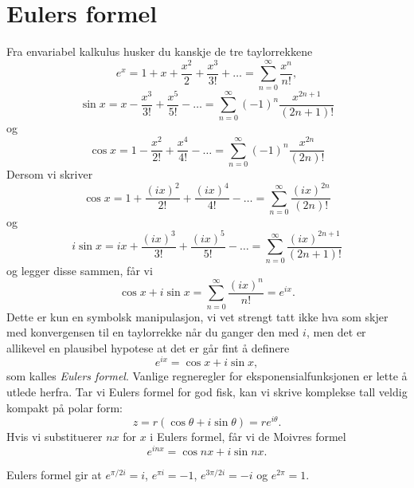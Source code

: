\section*{Eulers formel}
Fra envariabel kalkulus husker du kanskje de tre taylorrekkene
\[
e^{x}=1+x+\frac{x^{2}}{2}+\frac{x^{3}}{3!}+\dots=\sum_{n=0}^{\infty}\frac{x^{n}}{n!}, 
\]
\[
\sin{x}=x-\frac{x^{3}}{3!}+\frac{x^{5}}{5!}-\dots=\sum_{n=0}^{\infty}(-1)^{n}\frac{x^{2n+1}}{(2n+1)!} 
\]
og
\[
\cos{x}=1-\frac{x^{2}}{2!}+\frac{x^{4}}{4!}-\dots=\sum_{n=0}^{\infty}(-1)^{n}\frac{x^{2n}}{(2n)!}
\]
Dersom vi skriver 
\[
\cos{x}=1+\frac{(ix)^{2}}{2!}+\frac{(ix)^{4}}{4!}-\dots=\sum_{n=0}^{\infty}\frac{(ix)^{2n}}{(2n)!}
\]
og 
\[
i\sin{x}=ix+\frac{(ix)^{3}}{3!}+\frac{(ix)^{5}}{5!}-\dots=\sum_{n=0}^{\infty}\frac{(ix)^{2n+1}}{(2n+1)!}
\]
og legger disse sammen, får vi 
\[
\cos x + i\sin x=\sum_{n=0}^{\infty}\frac{(ix)^{n}}{n!}=e^{ix}.
\]
Dette er kun en symbolsk manipulasjon, vi vet strengt tatt ikke hva som skjer med konvergensen til en taylorrekke når du ganger den med $i$, men det er allikevel en plausibel hypotese at det er går fint å definere
\[
e^{ix}=\cos x + i\sin x,
\]
som kalles \emph{Eulers formel}. Vanlige regneregler for eksponensialfunksjonen er lette å utlede herfra.
Tar vi Eulers formel for god fisk, kan vi skrive komplekse tall veldig kompakt på polar form:
\[
z=r(\cos \theta+i\sin \theta)=re^{i\theta}.
\]
Hvis vi substituerer $nx$ for $x$ i Eulers formel, får vi de Moivres formel
\[
e^{inx}=\cos nx + i\sin nx.
\]

\begin{ex}
Eulers formel gir at $e^{\pi/2 i}=i$, $e^{\pi i}=-1$, $e^{3\pi/2 i}=-i$ og $e^{2\pi}=1$.
\end{ex}

